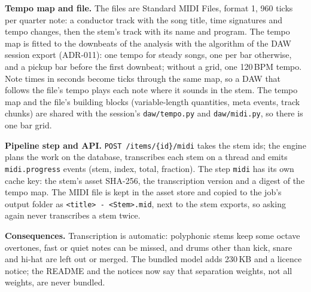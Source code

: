 \textbf{Tempo map and file.} The files are Standard MIDI Files, format 1,
960 ticks per quarter note: a conductor track with the song title, time
signatures and tempo changes, then the stem's track with its name and
program. The tempo map is fitted to the downbeats of the analysis with the
algorithm of the DAW session export (ADR-011): one tempo for steady songs,
one per bar otherwise, and a pickup bar before the first downbeat; without a
grid, one 120\,BPM tempo. Note times in seconds become ticks through the same
map, so a DAW that follows the file's tempo plays each note where it sounds in
the stem. The tempo map and the file's building blocks (variable-length
quantities, meta events, track chunks) are shared with the session's
\texttt{daw/tempo.py} and \texttt{daw/midi.py}, so there is one bar grid.

\textbf{Pipeline step and API.} \texttt{POST /items/\{id\}/midi} takes the
stem ids; the engine plans the work on the database, transcribes each stem on
a thread and emits \texttt{midi.progress} events (stem, index, total,
fraction). The step \texttt{midi} has its own cache key: the stem's asset
SHA-256, the transcription version and a digest of the tempo map. The MIDI
file is kept in the asset store and copied to the job's output folder as
\texttt{<title> - <Stem>.mid}, next to the stem exports, so asking again
never transcribes a stem twice.

\textbf{Consequences.} Transcription is automatic: polyphonic stems keep some
octave overtones, fast or quiet notes can be missed, and drums other than
kick, snare and hi-hat are left out or merged. The bundled model adds 230\,KB
and a licence notice; the README and the notices now say that separation
weights, not all weights, are never bundled.
